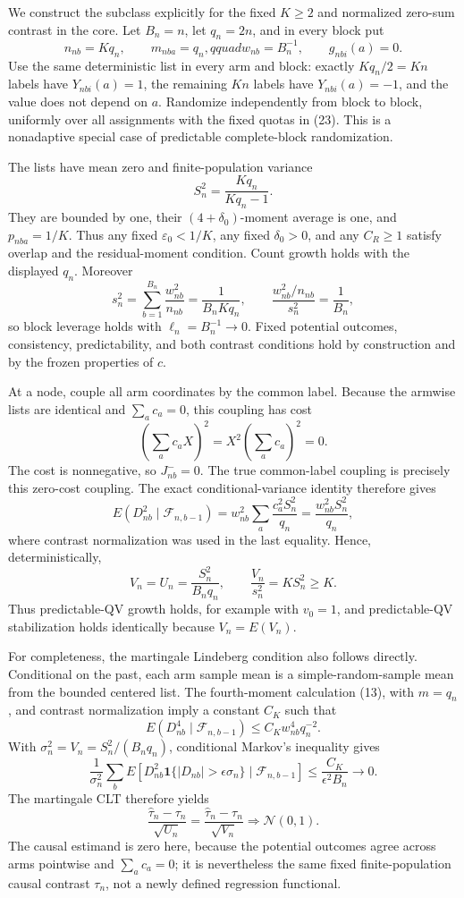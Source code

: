 We construct the subclass explicitly for the fixed \(K\ge2\) and normalized zero-sum contrast in the core. Let \(B_n=n\), let \(q_n=2n\), and in every block put
\[
n_{nb}=Kq_n,\qquad m_{nba}=q_n,qquad
w_{nb}=B_n^{-1},\qquad g_{nbi}(a)=0.
\tag{23}
\]
Use the same deterministic list in every arm and block: exactly \(Kq_n/2=Kn\) labels have \(Y_{nbi}(a)=1\), the remaining \(Kn\) labels have \(Y_{nbi}(a)=-1\), and the value does not depend on \(a\). Randomize independently from block to block, uniformly over all assignments with the fixed quotas in (23). This is a nonadaptive special case of predictable complete-block randomization.

The lists have mean zero and finite-population variance
\[
S_n^2=\frac{Kq_n}{Kq_n-1}.
\tag{24}
\]
They are bounded by one, their \((4+\delta_0)\)-moment average is one, and \(p_{nba}=1/K\). Thus any fixed \(\varepsilon_0<1/K\), any fixed \(\delta_0>0\), and any \(C_R\ge1\) satisfy overlap and the residual-moment condition. Count growth holds with the displayed \(q_n\). Moreover
\[
s_n^2=\sum_{b=1}^{B_n}\frac{w_{nb}^2}{n_{nb}}
=\frac1{B_nKq_n},
\qquad
\frac{w_{nb}^2/n_{nb}}{s_n^2}=\frac1{B_n},
\tag{25}
\]
so block leverage holds with \(\ell_n=B_n^{-1}\to0\). Fixed potential outcomes, consistency, predictability, and both contrast conditions hold by construction and by the frozen properties of \(c\).

At a node, couple all arm coordinates by the common label. Because the armwise lists are identical and \(\sum_ac_a=0\), this coupling has cost
\[
\left(\sum_ac_aX\right)^2=X^2\left(\sum_ac_a\right)^2=0.
\]
The cost is nonnegative, so \(J_{nb}^{-}=0\). The true common-label coupling is precisely this zero-cost coupling. The exact conditional-variance identity therefore gives
\[
E(D_{nb}^2\mid\mathcal F_{n,b-1})
=w_{nb}^2\sum_a\frac{c_a^2S_n^2}{q_n}
=\frac{w_{nb}^2S_n^2}{q_n},
\tag{26}
\]
where contrast normalization was used in the last equality. Hence, deterministically,
\[
V_n=U_n=\frac{S_n^2}{B_nq_n},
\qquad
\frac{V_n}{s_n^2}=KS_n^2\ge K.
\tag{27}
\]
Thus predictable-QV growth holds, for example with \(v_0=1\), and predictable-QV stabilization holds identically because \(V_n=E(V_n)\).

For completeness, the martingale Lindeberg condition also follows directly. Conditional on the past, each arm sample mean is a simple-random-sample mean from the bounded centered list. The fourth-moment calculation (13), with \(m=q_n\), and contrast normalization imply a constant \(C_K\) such that
\[
E(D_{nb}^4\mid\mathcal F_{n,b-1})\le C_Kw_{nb}^4q_n^{-2}.
\tag{28}
\]
With \(\sigma_n^2=V_n=S_n^2/(B_nq_n)\), conditional Markov's inequality gives
\[
\frac1{\sigma_n^2}\sum_bE\left[D_{nb}^2
\mathbf1\{|D_{nb}|>\epsilon\sigma_n\}\mid\mathcal F_{n,b-1}\right]
\le\frac{C_K}{\epsilon^2B_n}\longrightarrow0.
\tag{29}
\]
The martingale CLT therefore yields
\[
\frac{\widehat\tau_n-\tau_n}{\sqrt{U_n}}
=\frac{\widehat\tau_n-\tau_n}{\sqrt{V_n}}
\Rightarrow\mathcal N(0,1).
\tag{30}
\]
The causal estimand is zero here, because the potential outcomes agree across arms pointwise and \(\sum_ac_a=0\); it is nevertheless the same fixed finite-population causal contrast \(\tau_n\), not a newly defined regression functional.

